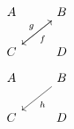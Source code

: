 \documentclass{article}
\begin{document}
\[
\begin{tikzcd}
A\arrow[r,from=1-2,to=2-1,"f"] & B \\
C\arrow[from=2-1,to=1-2,"g"] & D
\end{tikzcd}
\]
\[
\begin{tikzcd}
A\arrow[dr,from={1-2},to={2-1},"h"] & B \\
C & D
\end{tikzcd}
\]
\end{document}
